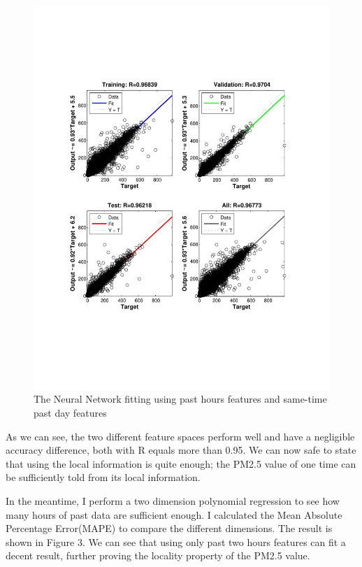 \documentclass{sig-alternate}
\begin{document}
\begin{figure}[ht]
\centering
\includegraphics[scale = 0.4, trim = 250 150 250 150]{pic/reg2.pdf}
\caption{The Neural Network fitting using past hours features and same-time past day features}
\end{figure}


As we can see, the two different feature spaces perform well and have a negligible accuracy difference, both with R equals more than 0.95. We can now safe to state that using the local information is quite enough; the PM2.5 value of one time can be sufficiently told from its local information.


In the meantime, I perform a two dimension polynomial regression to see how many hours of past data are sufficient enough. I calculated the Mean Absolute Percentage Error(MAPE) to compare the different dimensions. The result is shown in Figure 3. We can see that using only past two hours features can fit a decent result, further proving the locality property of the PM2.5 value.
\end{document}

